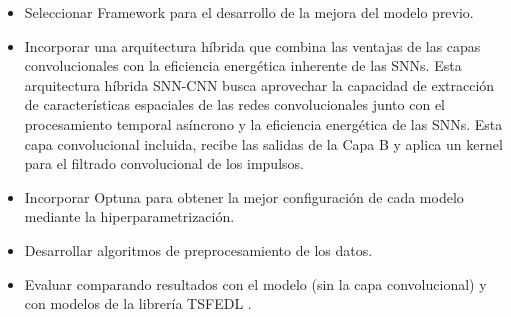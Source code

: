 \begin{itemize}
    \item Seleccionar Framework para el desarrollo de la mejora del modelo previo.
    \item Incorporar una arquitectura híbrida que combina las ventajas de las capas convolucionales con la eficiencia energética inherente de las SNNs. Esta arquitectura híbrida SNN-CNN busca aprovechar la capacidad de extracción de características espaciales de las redes convolucionales junto con el procesamiento temporal asíncrono y la eficiencia energética de las SNNs. Esta  capa convolucional incluida, recibe las salidas de la Capa B y aplica un kernel para el filtrado convolucional de los impulsos.
    \item Incorporar Optuna para obtener la mejor configuración de cada modelo mediante la hiperparametrización.
    \item Desarrollar algoritmos de preprocesamiento de los datos.
    \item Evaluar comparando resultados con el modelo (sin la capa convolucional) y con modelos de la librería TSFEDL \cite{AGUILERAMARTOS2023223}.

\end{itemize}



